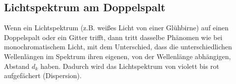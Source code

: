 \subsection{Lichtspektrum am Doppelspalt}

Wenn ein Lichtspektrum (z.B. weißes Licht von einer Glühbirne) auf einen Doppelspalt oder ein Gitter trifft, dann tritt dasselbe Phänomen wie bei monochromatischem Licht, mit dem Unterschied, dass die unterschiedlichen Wellenlängen im Spektrum ihren eigenen, von der Wellenlänge abhängigen, Abstand $d_k$ haben. Dadurch wird das Lichtspektrum von violett bis rot aufgefächert (Dispersion).